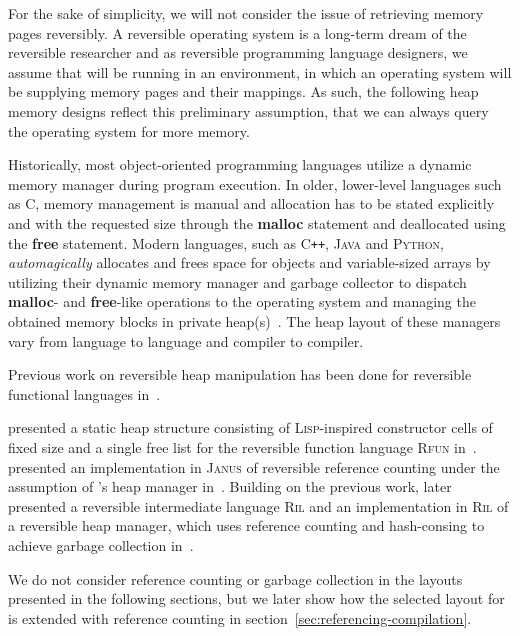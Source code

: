 For the sake of simplicity, we will not consider the issue of retrieving memory pages reversibly. A reversible operating system is a long-term dream of the reversible researcher and as reversible programming language designers, we assume that \rooplpp will be running in an environment, in which an operating system will be supplying memory pages and their mappings. As such, the following heap memory designs reflect this preliminary assumption, that we can always query the operating system for more memory. 

Historically, most object-oriented programming languages utilize a dynamic memory manager during program execution. In older, lower-level languages such as \textsc{C}, memory management is manual and allocation has to be stated explicitly and with the requested size through the \textbf{malloc} statement and deallocated using the \textbf{free} statement. Modern languages, such as \textsc{C\texttt{++}}, \textsc{Java} and \textsc{Python}, \textit{automagically} allocates and frees space for objects and variable-sized arrays by utilizing their dynamic memory manager and garbage collector to dispatch \textbf{malloc}- and \textbf{free}-like operations to the operating system and managing the obtained memory blocks in private heap(s)~\cite{wh:cpp_memory, bv:jvm, py:memory}. The heap layout of these managers vary from language to language and compiler to compiler.

Previous work on reversible heap manipulation has been done for reversible functional languages in~\cite{ha:heap, jsk:translation, tm:garbage}.

\citeauthor{ha:heap} presented a static heap structure consisting of \textsc{Lisp}-inspired constructor cells of fixed size and a single free list for the reversible function language \textsc{Rfun} in~\cite{ha:heap}. \citeauthor{tm:refcounting} presented an implementation in \textsc{Janus} of reversible reference counting under the assumption of \citeauthor{ha:heap}'s heap manager in~\cite{tm:refcounting}. Building on the previous work, \citeauthor{tm:garbage} later presented a reversible intermediate language \textsc{Ril} and an implementation in \textsc{Ril} of a reversible heap manager, which uses reference counting and hash-consing to achieve garbage collection in~\cite{tm:garbage}.

We do not consider reference counting or garbage collection in the layouts presented in the following sections, but we later show how the selected layout for \rooplpp is extended with reference counting in section~\ref{sec:referencing-compilation}.

